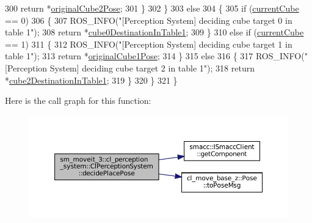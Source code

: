 \begin{DoxyCode}
300         \textcolor{keywordflow}{return} *\hyperlink{classsm__moveit__3_1_1cl__perception__system_1_1ClPerceptionSystem_a71df0282435faa5f108c4fb2d846e90f}{originalCube2Pose};
301       \}
302     \}
303     \textcolor{keywordflow}{else}
304     \{
305       \textcolor{keywordflow}{if} (\hyperlink{classsm__moveit__3_1_1cl__perception__system_1_1ClPerceptionSystem_ad915fc687481d4157ec40de52f8eaa82}{currentCube} == 0)
306       \{
307         ROS\_INFO(\textcolor{stringliteral}{"[Perception System] deciding cube target 0 in table 1"});
308         \textcolor{keywordflow}{return} *\hyperlink{classsm__moveit__3_1_1cl__perception__system_1_1ClPerceptionSystem_a56f5be6a474c2825b99cab724d2099a1}{cube0DestinationInTable1};
309       \}
310       \textcolor{keywordflow}{else} \textcolor{keywordflow}{if} (\hyperlink{classsm__moveit__3_1_1cl__perception__system_1_1ClPerceptionSystem_ad915fc687481d4157ec40de52f8eaa82}{currentCube} == 1)
311       \{
312         ROS\_INFO(\textcolor{stringliteral}{"[Perception System] deciding cube target 1 in table 1"});
313         \textcolor{keywordflow}{return} *\hyperlink{classsm__moveit__3_1_1cl__perception__system_1_1ClPerceptionSystem_aaf71c0201292be01979762e7f893878d}{originalCube1Pose};
314       \}
315       \textcolor{keywordflow}{else}
316       \{
317         ROS\_INFO(\textcolor{stringliteral}{"[Perception System] deciding cube target 2 in table 1"});
318         \textcolor{keywordflow}{return} *\hyperlink{classsm__moveit__3_1_1cl__perception__system_1_1ClPerceptionSystem_a1aae7fcf13de6c6b6c07dd2b595a5538}{cube2DestinationInTable1};
319       \}
320     \}
321   \}
\end{DoxyCode}
Here is the call graph for this function\+:
\nopagebreak
\begin{figure}[H]
\begin{center}
\leavevmode
\includegraphics[width=350pt]{classsm__moveit__3_1_1cl__perception__system_1_1ClPerceptionSystem_a0ee47269c0aacdced77b9bbe9577499d_cgraph}
\end{center}
\end{figure}
\mbox{\label{classsm__moveit__3_1_1cl__perception__system_1_1ClPerceptionSystem_a6abfb0c37f72ea92986d3d007f668dbb}} 

